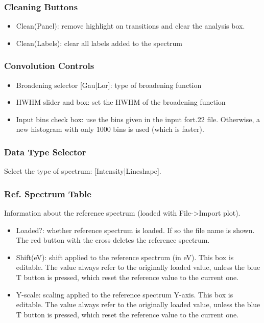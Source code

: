 \documentclass[a4paper,11pt]{article}
\begin{document}
\subsubsection{Cleaning Buttons}
\begin{itemize}
 \item Clean(Panel): remove highlight on transitions and clear the analysis box.
 \item Clean(Labels): clear all labels added to the spectrum
\end{itemize}

\subsubsection{Convolution Controls}
\begin{itemize}
 \item Broadening selector [Gau|Lor]: type of broadening function
 \item HWHM slider and box: set the HWHM of the broadening function
 \item Input bins check box: use the bins given in the input fort.22 file. Otherwise, a new histogram with only 1000 bins is used (which is faster).
\end{itemize}

\subsubsection{Data Type Selector}
Select the type of spectrum: [Intensity|Lineshape].

\subsubsection{Ref. Spectrum Table}
Information about the reference spectrum (loaded with File->Import plot).

\begin{itemize}
 \item Loaded?: whether reference spectrum is loaded. If so the file name is shown. The red button with the cross deletes the reference spectrum.
 \item Shift(eV): shift applied to the reference spectrum (in eV). This box is editable. The value always refer to the originally loaded value, unless the blue T button is pressed, which reset the reference value to the current one.
 \item Y-scale: scaling applied to the reference spectrum Y-axis. This box is editable. The value always refer to the originally loaded value, unless the blue T button is pressed, which reset the reference value to the current one.
\end{itemize}
\end{document}

